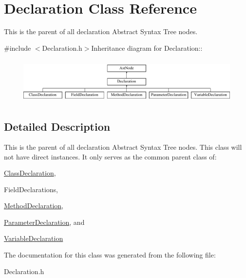 \hypertarget{classDeclaration}{
\section{Declaration Class Reference}
\label{classDeclaration}
}


This is the parent of all declaration Abstract Syntax Tree nodes.  


{\ttfamily \#include $<$Declaration.h$>$}Inheritance diagram for Declaration::\begin{figure}[H]
\begin{center}
\leavevmode
\includegraphics[height=2.34965cm]{classDeclaration}
\end{center}
\end{figure}


\subsection{Detailed Description}
This is the parent of all declaration Abstract Syntax Tree nodes. This class will not have direct instances. It only serves as the common parent class of:


\begin{DoxyItemize}
\item \hyperlink{classClassDeclaration}{ClassDeclaration},
\item FieldDeclarations,
\item \hyperlink{classMethodDeclaration}{MethodDeclaration},
\item \hyperlink{classParameterDeclaration}{ParameterDeclaration}, and
\item \hyperlink{classVariableDeclaration}{VariableDeclaration} 
\end{DoxyItemize}

The documentation for this class was generated from the following file:\begin{DoxyCompactItemize}
\item 
Declaration.h\end{DoxyCompactItemize}
